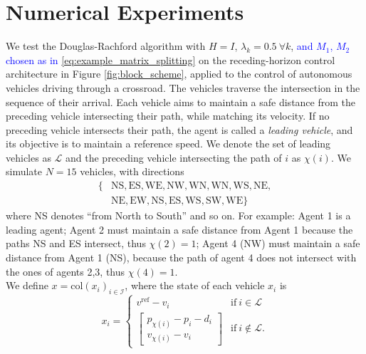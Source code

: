 \documentclass[letterpaper, 10 pt, conference]{ieeeconf}  %
\newcommand{\edit}[1]{\textcolor{blue}{#1}}
\newcommand{\mc}{\mathcal}
\newcommand{\col}{\mathrm{col}}
\begin{document}
{\section{Numerical Experiments}\label{sec: simulation}
We test the Douglas-Rachford algorithm {with $H=I$, $\lambda_k = 0.5~ \forall k$, \edit{and $M_1$, $M_2$ chosen as in \eqref{eq:example_matrix_splitting}} } on the receding-horizon control architecture in Figure \ref{fig:block_scheme}, applied to the control of autonomous vehicles driving through a crossroad. The vehicles traverse the intersection in the sequence of their arrival. Each vehicle aims to maintain a safe distance from the preceding vehicle intersecting their path, while matching its velocity. If no preceding vehicle intersects their path,  the agent is called a \emph{leading vehicle}, and its objective is to maintain a reference speed. We denote the set of leading vehicles as $\mc{L}$ and the preceding vehicle intersecting the path of $i$ as $\chi(i)$. {We simulate $N=15$ vehicles, with directions
\begin{align*}
    \{&\mathrm{NS}, \mathrm{ES}, \mathrm{WE}, 
    \mathrm{NW}, \mathrm{WN}, \mathrm{WN},
    \mathrm{WS}, \mathrm{NE}, \\
    &\mathrm{NE},
    \mathrm{EW}, \mathrm{NS}, \mathrm{ES}, \mathrm{WS}, \mathrm{SW}, \mathrm{WE}\}
\end{align*}
where \textrm{NS} denotes ``from North to South'' and so on.} For example: Agent 1 is a leading agent; Agent 2 must maintain a safe distance from Agent 1 because the paths \textrm{NS} and \textrm{ES} intersect, thus $\chi(2)=1$; Agent 4 (\textrm{NW}) must maintain a safe distance from Agent 1 (\textrm{NS}), because the path of agent 4 does not intersect with the ones of agents 2,3, thus $\chi(4)=1$. \\
We define $x=\col(x_i)_{i\in\mc I}$, where the state of each vehicle $x_i$ is
\begin{equation}
    x_i = \begin{cases} v^{\text{ref}} - v_i & \text{if}~i\in\mc L\\
        \begin{bmatrix}
            p_{\chi(i)} - p_i - d_i \\
            v_{\chi(i)} - v_i
    \end{bmatrix}  & \text{if}~i\notin\mc L.
    \end{cases}
\end{equation}
\begin{figure}
    \centering

\end{figure}}
\end{document}
